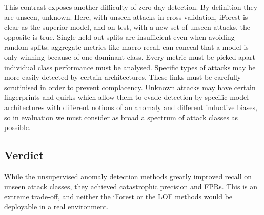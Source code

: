\documentclass{article}
\begin{document}
\par This contrast exposes another difficulty of zero-day detection. By definition they are unseen, unknown. Here, with unseen attacks in cross validation, iForest is clear as the superior model, and on test, with a new set of unseen attacks, the opposite is true. Single held-out splits are insufficient even when avoiding random-splits; aggregate metrics like macro recall can conceal that a model is only winning because of one dominant class. Every metric must be picked apart - individual class performance must be analysed. Specific types of attacks may be more easily detected by certain architectures. These links must be carefully scrutinised in order to prevent complacency. Unknown attacks may have certain fingerprints and quirks which allow them to evade detection by specific model architectures with different notions of an anomaly and different inductive biases, so in evaluation we must consider as broad a spectrum of attack classes as possible. 
\subsection{Verdict} 
While the unsupervised anomaly detection methods greatly improved recall on unseen attack classes, they achieved catastrophic precision and FPRs. This is an extreme trade-off, and neither the iForest or the LOF methods would be deployable in a real environment. 
\end{document}
